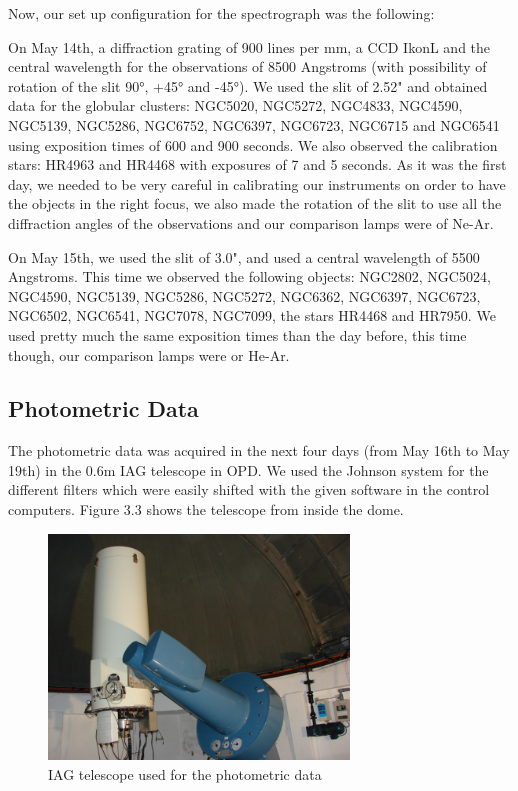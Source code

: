 Now, our set up configuration for the spectrograph was the following:

On May 14th, a diffraction grating of 900 lines per mm, a CCD IkonL and the central wavelength for the observations of 8500 Angstroms (with possibility of rotation of the slit 90°, +45° and -45°). We used the slit of 2.52" and obtained data for the globular clusters: NGC5020, NGC5272, NGC4833, NGC4590, NGC5139, NGC5286, NGC6752, NGC6397, NGC6723, NGC6715 and NGC6541 using exposition times of 600 and 900 seconds. We also observed the calibration stars: HR4963 and HR4468 with exposures of 7 and 5 seconds. As it was the first day, we needed to be very careful in calibrating our instruments on order to have the objects in the right focus, we also made the rotation of the slit to use all the diffraction angles of the observations and our comparison lamps were of Ne-Ar.

On May 15th, we used the slit of 3.0", and used a central wavelength of 5500 Angstroms. This time we observed the following objects: NGC2802, NGC5024, NGC4590, NGC5139, NGC5286, NGC5272, NGC6362, NGC6397, NGC6723, NGC6502, NGC6541, NGC7078, NGC7099, the stars HR4468 and HR7950. We used pretty much the same exposition times than the day before, this time though, our comparison lamps were or He-Ar.

\subsection{Photometric Data}

The photometric data was acquired in the next four days (from May 16th to May 19th) in the 0.6m IAG telescope in OPD. We used the Johnson system for the different filters which were easily shifted with the given software in the control computers. Figure 3.3 shows the telescope from inside the dome.

\begin{figure}[H]
\centering
\includegraphics[width=8cm]{images/opd-photometry.jpg}
\caption[IAG Telescope used for Photometry]{IAG telescope used for the photometric data}
\end{figure}

